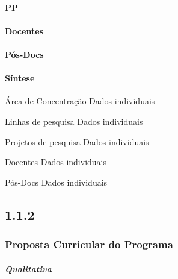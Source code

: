 \documentclass[
  a4paper,
]{book}
\begin{document}
\hypertarget{descricao-pp}{%
\paragraph{\texorpdfstring{\textbf{PP}}{PP}}\label{descricao-pp}}

\hypertarget{docentes-linhas-pesquisa}{%
\paragraph{\texorpdfstring{\textbf{Docentes}}{Docentes}}\label{docentes-linhas-pesquisa}}

\hypertarget{posdocs-linhas-pesquisa}{%
\paragraph{\texorpdfstring{\textbf{Pós-Docs}}{Pós-Docs}}\label{posdocs-linhas-pesquisa}}

\hypertarget{coerencia-quantitativo}{%
\paragraph{\texorpdfstring{\textbf{Síntese}}{Síntese}}\label{coerencia-quantitativo}}

Área de Concentração \textbar{} Dados individuais

Linhas de pesquisa \textbar{} Dados individuais

Projetos de pesquisa \textbar{} Dados individuais

Docentes \textbar{} Dados individuais

Pós-Docs \textbar{} Dados individuais

\hypertarget{section-1}{%
\subsection{\texorpdfstring{\textbf{1.1.2}}{1.1.2}}\label{section-1}}

\hypertarget{proposta-curricular-do-programa}{%
\subsubsection{\texorpdfstring{\textbf{Proposta Curricular do Programa}}{Proposta Curricular do Programa}}\label{proposta-curricular-do-programa}}

\hypertarget{qualitativa}{%
\paragraph{\texorpdfstring{\emph{Qualitativa}}{Qualitativa}}\label{qualitativa}}
\end{document}

